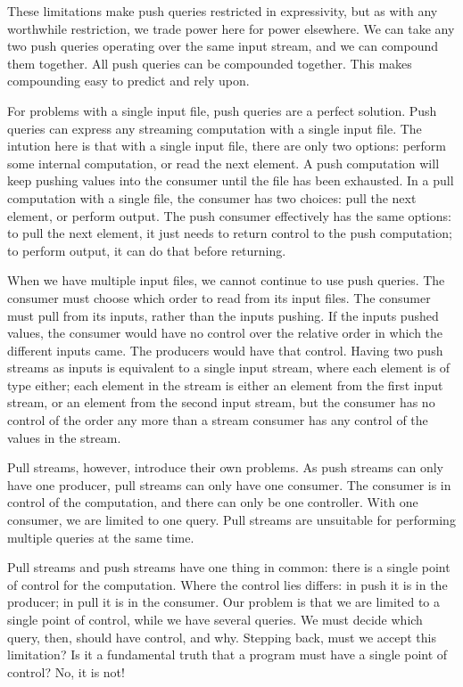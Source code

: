 These limitations make push queries restricted in expressivity, but as with any worthwhile restriction, we trade power here for power elsewhere.
We can take any two push queries operating over the same input stream, and we can compound them together.
All push queries can be compounded together.
This makes compounding easy to predict and rely upon.

For problems with a single input file, push queries are a perfect solution.
Push queries can express any streaming computation with a single input file.
The intution here is that with a single input file, there are only two options: perform some internal computation, or read the next element.
A push computation will keep pushing values into the consumer until the file has been exhausted.
In a pull computation with a single file, the consumer has two choices: pull the next element, or perform output.
The push consumer effectively has the same options: to pull the next element, it just needs to return control to the push computation; to perform output, it can do that before returning.

When we have multiple input files, we cannot continue to use push queries.
The consumer must choose which order to read from its input files.
The consumer must pull from its inputs, rather than the inputs pushing.
If the inputs pushed values, the consumer would have no control over the relative order in which the different inputs came.
The producers would have that control.
Having two push streams as inputs is equivalent to a single input stream, where each element is of type either; each element in the stream is either an element from the first input stream, or an element from the second input stream, but the consumer has no control of the order any more than a stream consumer has any control of the values in the stream.

Pull streams, however, introduce their own problems.
As push streams can only have one producer, pull streams can only have one consumer.
The consumer is in control of the computation, and there can only be one controller.
With one consumer, we are limited to one query.
Pull streams are unsuitable for performing multiple queries at the same time.

Pull streams and push streams have one thing in common: there is a single point of control for the computation.
Where the control lies differs: in push it is in the producer; in pull it is in the consumer.
Our problem is that we are limited to a single point of control, while we have several queries.
We must decide which query, then, should have control, and why.
Stepping back, must we accept this limitation?
Is it a fundamental truth that a program must have a single point of control? No, it is not!

